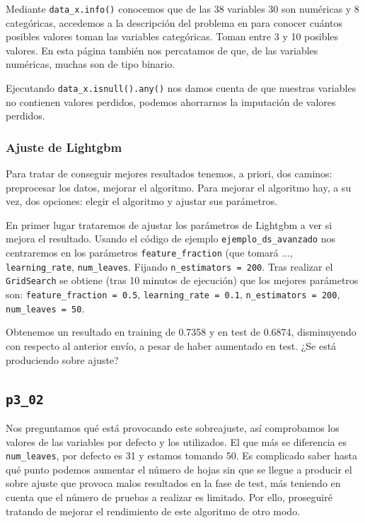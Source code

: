 \documentclass[a4paper, 20pt]{article}
\begin{document}
Mediante \texttt{data\_x.info()} conocemos que de las 38 variables 30 son numéricas y 8 categóricas, accedemos a la descripción del problema en %
para conocer cuántos posibles valores toman las variables categóricas. Toman entre 3 y 10 posibles valores. En esta página también nos percatamos de que, de las variables numéricas, muchas son de tipo binario.

Ejecutando \texttt{data\_x.isnull().any()} nos damos cuenta de que nuestras variables no contienen valores perdidos, podemos ahorrarnos la imputación de valores perdidos.


\subsubsection{Ajuste de Lightgbm}

Para tratar de conseguir mejores resultados tenemos, a priori, dos caminos: preprocesar los datos, mejorar el algoritmo. Para mejorar el algoritmo hay, a su vez, dos opciones: elegir el algoritmo y ajustar sus parámetros.

En primer lugar trataremos de ajustar los parámetros de Lightgbm a ver si mejora el resultado. Usando el código de ejemplo \texttt{ejemplo\_ds\_avanzado} nos centraremos en los parámetros \texttt{feature\_fraction} (que tomará ..., \texttt{learning\_rate}, \texttt{num\_leaves}. Fijando \texttt{n\_estimators = 200}. Tras realizar el \texttt{GridSearch} se obtiene (tras 10 minutos de ejecución) que los mejores parámetros son: \texttt{feature\_fraction = 0.5}, \texttt{learning\_rate = 0.1},  \texttt{n\_estimators = 200}, \texttt{num\_leaves = 50}.

Obtenemos un resultado en training de 0.7358 y en test de 0.6874, disminuyendo con respecto al anterior envío, a pesar de haber aumentado en test. ¿Se está produciendo sobre ajuste?

\subsection{\texttt{p3\_02}}

Nos preguntamos qué está provocando este sobreajuste, así comprobamos los valores de las variables por defecto y los utilizados. El que más se diferencia es \texttt{num\_leaves}, por defecto es 31 y estamos tomando 50. Es complicado saber hasta qué punto podemos aumentar el número de hojas sin que se llegue a producir el sobre ajuste que provoca malos resultados en la fase de test, más teniendo en cuenta que el número de pruebas a realizar es limitado. Por ello, proseguiré tratando de mejorar el rendimiento de este algoritmo de otro modo.
\end{document}
